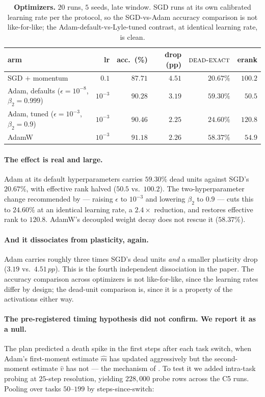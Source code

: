 \documentclass[10pt]{article}
\newcommand{\dexact}{\textsc{dead-exact}}
\newcommand{\pp}{\,pp}
\begin{document}
\begin{table}[t]
\centering
\caption{\textbf{Optimizers.} $20$ runs, $5$ seeds, late window. SGD runs at its
own calibrated learning rate per the protocol, so the SGD-vs-Adam accuracy
comparison is not like-for-like; the Adam-default-vs-Lyle-tuned contrast, at
identical learning rate, is clean.}
\label{tab:c5}
\small
\begin{tabular}{@{}l r r r r r@{}}
\toprule
arm & lr & acc.\ (\%) & drop (pp) & $\dexact$ & erank \\
\midrule
SGD $+$ momentum & $0.1$ & $87.71$ & $4.51$ & $20.67\%$ & $100.2$ \\
Adam, defaults ($\epsilon{=}10^{-8}$, $\beta_2{=}0.999$) & $10^{-3}$ & $90.28$ & $3.19$ & $\mathbf{59.30\%}$ & $50.5$ \\
Adam, tuned ($\epsilon{=}10^{-3}$, $\beta_2{=}0.9$) & $10^{-3}$ & $90.46$ & $2.25$ & $\mathbf{24.60\%}$ & $120.8$ \\
AdamW & $10^{-3}$ & $91.18$ & $2.26$ & $58.37\%$ & $54.9$ \\
\bottomrule
\end{tabular}
\end{table}

\paragraph{The effect is real and large.} Adam at its default hyperparameters
carries $59.30\%$ dead units against SGD's $20.67\%$, with effective rank halved
($50.5$ vs.\ $100.2$). The two-hyperparameter change recommended by
\citet{lyle2023understanding} --- raising $\epsilon$ to $10^{-3}$ and lowering
$\beta_2$ to $0.9$ --- cuts this to $24.60\%$ at an identical learning rate, a
$2.4\times$ reduction, and restores effective rank to $120.8$. AdamW's decoupled
weight decay \citep{loshchilov2019decoupled} does not rescue it ($58.37\%$).

\paragraph{And it dissociates from plasticity, again.} Adam carries roughly
three times SGD's dead units \emph{and} a smaller plasticity drop ($3.19$ vs.\
$4.51\pp$). This is the fourth independent dissociation in the paper. The
accuracy comparison across optimizers is not like-for-like, since the learning
rates differ by design; the dead-unit comparison is, since it is a property of
the activations either way.

\paragraph{The pre-registered timing hypothesis did not confirm. We report it as
a null.}
The plan predicted a death spike in the first steps after each task switch, when
Adam's first-moment estimate $\hat{m}$ has updated aggressively but the
second-moment estimate $\hat{v}$ has not --- the mechanism of
\citet{lyle2023understanding}. To test it we added intra-task probing at
$25$-step resolution, yielding $228{,}000$ probe rows across the C5 runs. Pooling
over tasks $50$--$199$ by steps-since-switch:
\end{document}
